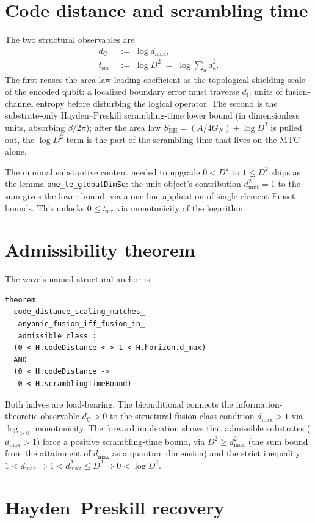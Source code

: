 \documentclass[twocolumn]{revtex4-2}
\newcommand{\dC}{d_{\mathrm{C}}}
\newcommand{\Dsq}{D^{2}}
\newcommand{\dmax}{d_{\max}}
\newcommand{\Tscr}{t_{\mathrm{scr}}}
\begin{document}
\section{Code distance and scrambling time}
\label{sec:dC_tscr}

The two structural observables are
\begin{align}
\dC &\;:=\; \log\dmax, \\
\Tscr &\;:=\; \log\Dsq \;=\; \log\sum_a d_a^2.
\end{align}
The first reuses the area-law leading coefficient as the
topological-shielding scale of the encoded qubit: a localized
boundary error must traverse $\dC$ units of fusion-channel entropy
before disturbing the logical operator. The second is the
substrate-only Hayden--Preskill scrambling-time lower bound (in
dimensionless units, absorbing $\beta/2\pi$); after the area law
$S_{\mathrm{BH}} = (A/4G_N) + \log\Dsq$ is pulled out, the
$\log\Dsq$ term is the part of the scrambling time that lives on
the MTC alone.

The minimal substantive content needed to upgrade $0 < \Dsq$ to
$1 \le \Dsq$ ships as the lemma \texttt{one\_le\_globalDimSq}: the
unit object's contribution $d_{\mathrm{unit}}^2 = 1$ to the sum
gives the lower bound, via a one-line application of single-element
Finset bounds. This unlocks $0 \le \Tscr$ via monotonicity of the
logarithm.

\section{Admissibility theorem}
\label{sec:admissibility}

The wave's named structural anchor is
\begin{verbatim}
theorem
  code_distance_scaling_matches_
   anyonic_fusion_iff_fusion_in_
   admissible_class :
  (0 < H.codeDistance <-> 1 < H.horizon.d_max)
  AND
  (0 < H.codeDistance ->
   0 < H.scramblingTimeBound)
\end{verbatim}
Both halves are load-bearing. The biconditional connects the
information-theoretic observable $\dC > 0$ to the structural
fusion-class condition $\dmax > 1$ via $\log_{>0}$ monotonicity. The
forward implication shows that admissible substrates ($\dmax > 1$)
force a positive scrambling-time bound, via $\Dsq \ge \dmax^2$ (the
sum bound from the attainment of $\dmax$ as a quantum dimension) and
the strict inequality $1 < \dmax \Rightarrow 1 < \dmax^2 \le \Dsq
\Rightarrow 0 < \log\Dsq$.

\section{Hayden--Preskill recovery}
\label{sec:recovery}
\end{document}
